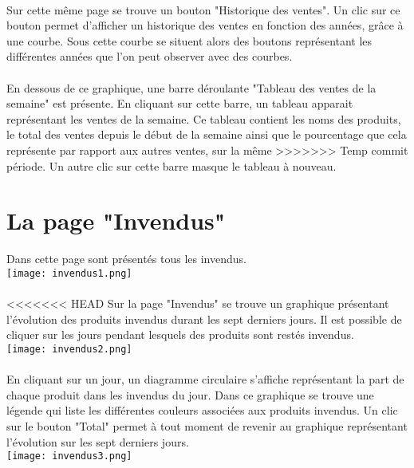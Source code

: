 \paragraph{}
Sur cette même page se trouve un bouton "Historique des ventes". Un clic sur ce
bouton permet d'afficher un historique des ventes en fonction des années,
grâce à une courbe. Sous cette courbe se situent alors des boutons représentant
les différentes années que l'on peut observer avec des courbes.

\paragraph{}
En dessous de ce graphique, une barre déroulante "Tableau des ventes de la
semaine" est présente. En cliquant sur cette barre, un tableau apparait
représentant les ventes de la semaine. Ce tableau contient les noms des
produits, le total des ventes depuis le début de la semaine ainsi que le
pourcentage que cela représente par rapport aux autres ventes, sur la même
>>>>>>> Temp commit
période. Un autre clic sur cette barre masque le tableau à nouveau.



\section{La page "Invendus"}
Dans cette page sont présentés tous les invendus.\\
\texttt{[image: invendus1.png]}
\paragraph{}
<<<<<<< HEAD
Sur la page "Invendus" se trouve un graphique présentant l'évolution des produits
invendus durant les sept derniers jours. Il est possible de cliquer sur les
jours pendant lesquels des produits sont restés invendus.\\
\texttt{[image: invendus2.png]}
\paragraph{}
En cliquant sur un jour, un diagramme circulaire s'affiche représentant la part de chaque produit dans les
invendus du jour. Dans ce graphique se trouve une légende qui liste les
différentes couleurs associées aux produits invendus. Un clic sur le bouton
"Total" permet à tout moment de revenir au graphique représentant l'évolution
sur les sept derniers jours.\\
\texttt{[image: invendus3.png]}
